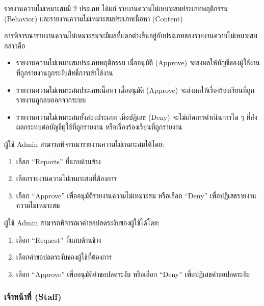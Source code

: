 
รายงานความไม่เหมาะสมมี 2 ประเภท ได้แก่ รายงานความไม่เหมาะสมประเภทพฤติกรรม (Behavior) และรายงานความไม่เหมาะสมประเภทเนื้อหา (Content)

การพิจารณารายงานความไม่เหมาะสมจะมีผลที่แตกต่างขึ้นอยู่กับประเภทของรายงานความไม่เหมาะสม กล่าวคือ

\begin{itemize}
    \item รายงานความไม่เหมาะสมประเภทพฤติกรรม เมื่ออนุมัติ (Approve) จะส่งผลให้บัญชีของผู้ใช้งานที่ถูกรายงานถูกระงับสิทธิ์การเข้าใช้งาน
    \item รายงานความไม่เหมาะสมประเภทเนื้อหา เมื่ออนุมัติ (Approve) จะส่งผลให้เรื่องร้องเรียนที่ถูกรายงานถูกลบออกจากระบบ
    \item รายงานความไม่เหมาะสมทั้งสองประเภท เมื่อปฏิเสธ (Deny) จะไม่เกิดการดำเนินการใด ๆ ที่ส่งผลกระทบต่อบัญชีผู้ใช้ที่ถูกรายงาน หรือเรื่องร้องเรียนที่ถูกรายงาน
\end{itemize}

\pagebreak[4]

ผู้ใช้ Admin สามารถพิจารณารายงานความไม่เหมาะสมได้โดย:

\begin{enumerate}
    \item เลือก ``Reports'' ที่แถบด้านข้าง
    \item เลือกรายงานความไม่เหมาะสมที่ต้องการ
    \item เลือก ``Approve'' เพื่ออนุมัติรายงานความไม่เหมาะสม หรือเลือก ``Deny'' เพื่อปฏิเสธรายงานความไม่เหมาะสม
\end{enumerate}


ผู้ใช้ Admin สามารถพิจารณาคำขอปลดระงับของผู้ใช้ได้โดย:

\begin{enumerate}
    \item เลือก ``Request'' ที่แถบด้านข้าง
    \item เลือกคำขอปลดระงับของผู้ใช้ที่ต้องการ
    \item เลือก ``Approve'' เพื่ออนุมัติคำขอปลดระงับ หรือเลือก ``Deny'' เพื่อปฏิเสธคำขอปลดระงับ
\end{enumerate}

\subsubsection{เจ้าหน้าที่ (Staff)}\label{subsubsec:role-usage-staff}


